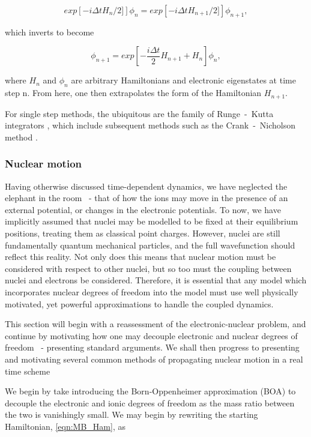 \begin{equation}
    exp\left[ - i \Delta t H_{n} / 2] \right] \phi_{n} = exp\left[ - i \Delta t H_{n+1} / 2] \right] \phi_{n+1},
\end{equation}

which inverts to become

\begin{equation}
    \phi_{n+1} = exp \left[ - \frac{i \Delta t}{2} H_{n+1} + H_{n} \right] \phi_{n},
\end{equation}

where $H_{n}$ and $\phi_{n}$ are arbitrary Hamiltonians and electronic eigenstates at time step n. From here, one then extrapolates the form of the Hamiltonian $H_{n+1}$. 

For single step methods, the ubiquitous are the family of Runge~-~Kutta integrators \cite{10.5555/22730}, which include subsequent methods such as the Crank~-~Nicholson method \cite{Crank1947APM}.

\subsubsection{Nuclear motion}
\label{sec:nuclear_motion}

Having otherwise discussed time-dependent dynamics, we have neglected the elephant in the room ~- that of how the ions may move in the presence of an external potential, or changes in the electronic potentials. To now, we have implicitly assumed that nuclei may be modelled to be fixed at their equilibrium positions, treating them as classical point charges. However, nuclei are still fundamentally quantum mechanical particles, and the full wavefunction should reflect this reality. Not only does this means that nuclear motion must be considered with respect to other nuclei, but so too must the coupling between nuclei and electrons be considered. Therefore, it is essential that any model which incorporates nuclear degrees of freedom into the model must use well physically motivated, yet powerful approximations to handle the coupled dynamics. 

This section will begin with a reassessment of the electronic-nuclear problem, and continue by motivating how one may decouple electronic and nuclear degrees of freedom ~- presenting standard arguments. We shall then progress to presenting and motivating several common methods of propagating nuclear motion in a real time scheme

We begin by take introducing the Born-Oppenheimer approximation (BOA) to decouple the electronic and ionic degrees of freedom as the mass ratio between the two is vanishingly small. We may begin by rewriting the starting Hamiltonian, \ref{eqn:MB_Ham}, as

